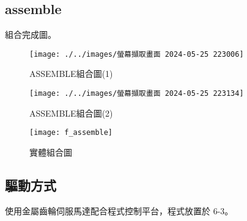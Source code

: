 \newpage

\subsection{assemble}

組合完成圖。

\begin{figure}[htbp]
    \centering
    \texttt{[image: ./../images/螢幕擷取畫面 2024-05-25 223006]}
    \caption{ASSEMBLE組合圖(1)}
\end{figure}

\begin{figure}[htbp]
    \centering
    \texttt{[image: ./../images/螢幕擷取畫面 2024-05-25 223134]}
    \caption{ASSEMBLE組合圖(2)}
\end{figure}

\begin{figure}[htbp]
    \centering
    \texttt{[image: f\_assemble]}
    \caption{實體組合圖}
\end{figure}



\subsection{驅動方式}

使用金屬齒輪伺服馬達配合程式控制平台，程式放置於 6-3。

